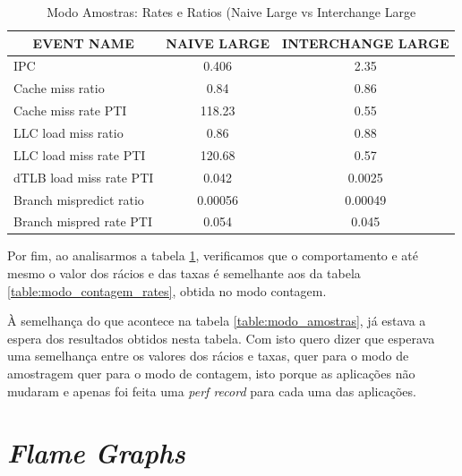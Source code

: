 \documentclass[conference,compsoc]{IEEEtran}
\begin{document}
\begin{table}[h!]
\centering
\scriptsize
\begin{tabular}{|l|c|c|}
\hline
\multicolumn{1}{|c|}{\textbf{EVENT NAME}} & \textbf{NAIVE LARGE} & \textbf{INTERCHANGE LARGE} \\ \hline
IPC                                       & 0.406                & 2.35                       \\ \hline
Cache miss ratio                          & 0.84                 & 0.86                       \\ \hline
Cache miss rate PTI                       & 118.23               & 0.55                       \\ \hline
LLC load miss ratio                       & 0.86                 & 0.88                       \\ \hline
LLC load miss rate PTI                    & 120.68               & 0.57                       \\ \hline
dTLB load miss rate PTI                   & 0.042                & 0.0025                     \\ \hline
Branch mispredict ratio                   & 0.00056              & 0.00049                    \\ \hline
Branch mispred rate PTI                   & 0.054                & 0.045                      \\ \hline
\end{tabular}
\caption{Modo Amostras: Rates e Ratios (Naive Large vs Interchange Large}
\label{table:modo_amostras_ratios}
\end{table}

Por fim, ao analisarmos a tabela \ref{table:modo_amostras_ratios}, verificamos que o comportamento e até mesmo o valor dos rácios e das taxas é semelhante aos da tabela \ref{table:modo_contagem_rates}, obtida no modo contagem. 

À semelhança do que acontece na tabela \ref{table:modo_amostras}, já estava a espera dos resultados obtidos nesta tabela. Com isto quero dizer que esperava uma semelhança entre os valores dos rácios e taxas, quer para o modo de amostragem quer para o modo de contagem, isto porque as aplicações não mudaram e apenas foi feita uma \textit{perf record} para cada uma das aplicações.

\section{\textit{Flame Graphs}}
\end{document}
